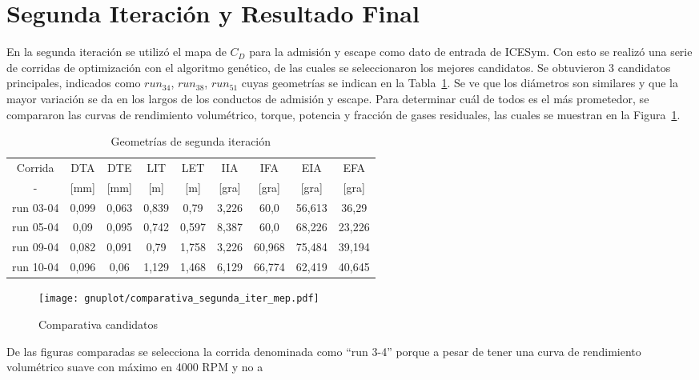 \section{Segunda Iteración y Resultado Final}
%
En la segunda iteración se utilizó el mapa de $C_D$ para la admisión y escape
como dato de entrada de ICESym.
%
Con esto se realizó una serie de corridas de optimización con el algoritmo
genético, de las cuales se seleccionaron los mejores candidatos.
%
Se obtuvieron 3 candidatos principales, indicados como \emph{$run_{34}$},
\emph{$run_{38}$}, \emph{$run_{51}$} cuyas geometrías se indican en la
Tabla~\ref{tab:2iter_geom}.
%
Se ve que los diámetros son similares y que la mayor variación se da en los
largos de los conductos de admisión y escape.
%
%
Para determinar cuál de todos es el más prometedor, se compararon las curvas de
rendimiento volumétrico, torque, potencia y fracción de gases residuales, las
cuales se muestran en la Figura~\ref{fig:comparativa_segunda_iter}.

\begin{table}
  \centering
  \begin{tabular}{ccccccccc}\toprule
    Corrida   & DTA   & DTE   & LIT   & LET   & IIA   & IFA    & EIA    & EFA \\
    -         & [mm]  & [mm]  & [m]   & [m]   & [gra] & [gra]  & [gra]  & [gra] \\ \midrule
    run 03-04 & 0,099 & 0,063 & 0,839 & 0,79  & 3,226 & 60,0   & 56,613 & 36,29 \\
    run 05-04 & 0,09  & 0,095 & 0,742 & 0,597 & 8,387 & 60,0   & 68,226 & 23,226 \\
    run 09-04 & 0,082 & 0,091 & 0,79  & 1,758 & 3,226 & 60,968 & 75,484 & 39,194 \\
    run 10-04 & 0,096 & 0,06  & 1,129 & 1,468 & 6,129 & 66,774 & 62,419 & 40,645 \\ \bottomrule
  \end{tabular}
  \caption{Geometrías de segunda iteración}\label{tab:2iter_geom}
\end{table}

\begin{figure}
  \centering
  \texttt{[image: gnuplot/comparativa\_segunda\_iter\_mep.pdf]}
  \caption{Comparativa candidatos} \label{fig:comparativa_segunda_iter}
\end{figure}

De las figuras comparadas se selecciona la corrida denominada como ``run 3-4''
porque a pesar de tener una curva de rendimiento volumétrico suave con máximo en
4000 RPM y no a

